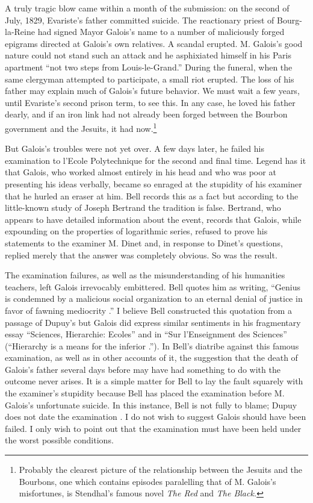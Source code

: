 \documentclass[12pt]{article}
\begin{document}
A truly tragic blow came within a month of the submission: on the second of July, 1829, Evariste's father committed suicide. The reactionary priest of Bourg-la-Reine had signed Mayor Galois's name to a number of maliciously forged epigrams directed at Galois's own relatives. A scandal erupted. M. Galois's good nature could not stand such an attack and he asphixiated himself in his Paris apartment ``not two steps from Louis-le-Grand.'' During the funeral, when the same clergyman attempted to participate, a small riot erupted. The loss of his father may explain much of Galois's future behavior. We must wait a few years, until Evariste's second prison term, to see this. In any case, he loved his father dearly, and if an iron link had not already been forged between the Bourbon government and the Jesuits, it had now.\footnote{Probably the clearest picture of the relationship between the Jesuits and the Bourbons, one which contains episodes paralelling that of M. Galois's misfortunes, is Stendhal's famous novel \emph{The Red} and \emph{The Black.}}

But Galois's troubles were not yet over. A few days later, he failed his examination to l'Ecole Polytechnique for the second and final time. Legend has it that Galois, who worked almost entirely in his head and who was poor at presenting his ideas verbally, became so enraged at the stupidity of his examiner that he hurled an eraser at him. Bell records this as a fact \cite{25} but according to the little-known study of Joseph Bertrand \cite{26} the tradition is false. Bertrand, who appears to have detailed information about the event, records that Galois, while expounding on the properties of logarithmic series, refused to prove his statements to the examiner M. Dinet and, in response to Dinet's questions, replied merely that the answer was completely obvious. So was the result.

The examination failures, as well as the misunderstanding of his humanities teachers, left Galois irrevocably embittered. Bell quotes him as writing, ``Genius is condemned by a malicious social organization to an eternal denial of justice in favor of fawning mediocrity \cite{27}.'' I believe Bell constructed this quotation from a passage of Dupuy's \cite{28} but Galois did express similar sentiments in his fragmentary essay ``Sciences, Hierarchie: Ecoles'' and in ``Sur l'Enseignment des Sciences'' (``Hierarchy is a means for the inferior \cite{29}.''). In Bell's diatribe against this famous examination, as well as in other accounts of it, the suggestion that the death of Galois's father several days before may have had something to do with the outcome never arises. It is a simple matter for Bell to lay the fault squarely with the examiner's stupidity because Bell has placed the examination before M. Galois's unfortunate suicide. In this instance, Bell is not fully to blame; Dupuy does not date the examination \cite{30}. I do not wish to suggest Galois should have been failed. I only wish to point out that the examination must have been held under the worst possible conditions.
\end{document}
